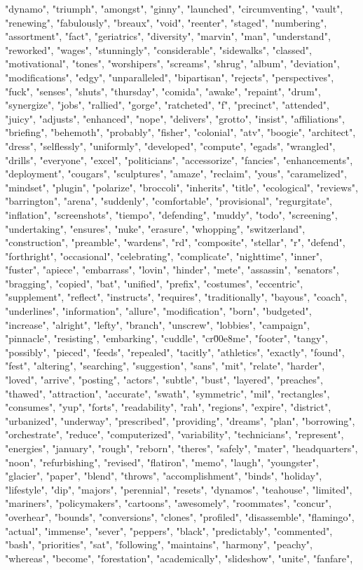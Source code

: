 "dynamo", "triumph", "amongst", "ginny", "launched", "circumventing", "vault", "renewing", "fabulously", "breaux", "void", "reenter", "staged", "numbering", "assortment", "fact", "geriatrics", "diversity", "marvin", "man", "understand", "reworked", "wages", "stunningly", "considerable", "sidewalks", "classed", "motivational", "tones", "worshipers", "screams", "shrug", "album", "deviation", "modifications", "edgy", "unparalleled", "bipartisan", "rejects", "perspectives", "fuck", "senses", "shuts", "thursday", "comida", "awake", "repaint", "drum", "synergize", "jobs", "rallied", "gorge", "ratcheted", "f", "precinct", "attended", "juicy", "adjusts", "enhanced", "nope", "delivers", "grotto", "insist", "affiliations", "briefing", "behemoth", "probably", "fisher", "colonial", "atv", "boogie", "architect", "dress", "selflessly", "uniformly", "developed", "compute", "egads", "wrangled", "drills", "everyone", "excel", "politicians", "accessorize", "fancies", "enhancements", "deployment", "cougars", "sculptures", "amaze", "reclaim", "yous", "caramelized", "mindset", "plugin", "polarize", "broccoli", "inherits", "title", "ecological", "reviews", "barrington", "arena", "suddenly", "comfortable", "provisional", "regurgitate", "inflation", "screenshots", "tiempo", "defending", "muddy", "todo", "screening", "undertaking", "ensures", "nuke", "erasure", "whopping", "switzerland", "construction", "preamble", "wardens", "rd", "composite", "stellar", "r", "defend", "forthright", "occasional", "celebrating", "complicate", "nighttime", "inner", "fuster", "apiece", "embarrass", "lovin", "hinder", "mete", "assassin", "senators", "bragging", "copied", "bat", "unified", "prefix", "costumes", "eccentric", "supplement", "reflect", "instructs", "requires", "traditionally", "bayous", "coach", "underlines", "information", "allure", "modification", "born", "budgeted", "increase", "alright", "lefty", "branch", "unscrew", "lobbies", "campaign", "pinnacle", "resisting", "embarking", "cuddle", "cr\u00e8me", "footer", "tangy", "possibly", "pieced", "feeds", "repealed", "tacitly", "athletics", "exactly", "found", "fest", "altering", "searching", "suggestion", "sans", "mit", "relate", "harder", "loved", "arrive", "posting", "actors", "subtle", "bust", "layered", "preaches", "thawed", "attraction", "accurate", "swath", "symmetric", "mil", "rectangles", "consumes", "yup", "forts", "readability", "rah", "regions", "expire", "district", "urbanized", "underway", "prescribed", "providing", "dreams", "plan", "borrowing", "orchestrate", "reduce", "computerized", "variability", "technicians", "represent", "energies", "january", "rough", "reborn", "theres", "safely", "mater", "headquarters", "noon", "refurbishing", "revised", "flatiron", "memo", "laugh", "youngster", "glacier", "paper", "blend", "throws", "accomplishment", "binds", "holiday", "lifestyle", "dip", "majors", "perennial", "resets", "dynamos", "teahouse", "limited", "mariners", "policymakers", "cartoons", "awesomely", "roommates", "concur", "overhear", "bounds", "conversions", "clones", "profiled", "disassemble", "flamingo", "actual", "immense", "sever", "peppers", "black", "predictably", "commented", "bash", "priorities", "sat", "following", "maintains", "harmony", "peachy", "whereas", "become", "forestation", "academically", "slideshow", "unite", "fanfare", 
